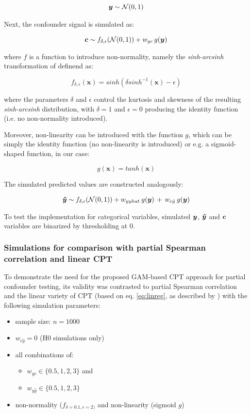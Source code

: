 \documentclass{article}
\begin{document}
$$ \boldsymbol{y} \sim \mathcal{N}(0, 1) $$

Next, the confounder signal is simulated as:

$$ \boldsymbol{c} \sim f_{\delta, \epsilon}(\mathcal{N}(0, 1)) + w_{yc} \, g(\boldsymbol{y}) $$

where $f$ is a function to introduce non-normality, namely the \emph{sinh-arcsinh} transformation of \cite{jones2009sinh} definend as:

$$f_{\delta, \epsilon}(\boldsymbol{x}) = sinh(\delta sinh^{-1}(\boldsymbol{x}) - \epsilon)$$

where the parameters $\delta$ and $\epsilon$ control the kurtosis and skewness of the resulting \emph{sinh-arcsinh} distribution, with $\delta=1$ and $\epsilon=0$ producing the identity function (i.e. no non-normality introduced).

Moreover, non-linearity can be introduced with the function $g$, which can be simply the identity function (no non-linearity is introduced) or e.g. a sigmoid-shaped function, in our case:

$$ g(\boldsymbol{x}) = tanh(\boldsymbol{x}) $$


The simulated predicted values are constructed analogously:

$$ \boldsymbol{\hat{y}} \sim f_{\delta, \epsilon}(\mathcal{N}(0, 1)) + w_{yyhat} \: g(\boldsymbol{y}) \, + \, w_{c\hat{y}} \: g(\boldsymbol{y})$$

To test the implementation for categorical variables, simulated $\boldsymbol{y}$, $\boldsymbol{\hat{y}}$ and $\boldsymbol{c}$ variables are binarized by thresholding at 0.

\subsubsection*{Simulations for comparison with partial Spearman correlation and linear CPT}

To demonstrate the need for the proposed GAM-based CPT approach for partial confounder testing, its validity was contrasted to partial Spearman correlation and the linear variety of CPT (based on eq. \ref{eq:linreg}, as described by \cite{berrett2020conditional}) with the following simulation parameters:
\begin{itemize}
    \item sample size: $n = 1000$
    \item $w_{c\hat{y}} = 0$ (H0 simulations only)
    \item all combinations of:
    \begin{itemize}
        \item $w_{yc} \in \{0.5, 1, 2, 3\}$ and
        \item $w_{y\hat{y}} \in \{0.5, 1, 2, 3\}$
    \end{itemize}
    \item non-normality ($f_{\delta = 0.1, \epsilon = 2)}$ and non-linearity (sigmoid $g$)
\end{itemize}
\end{document}

